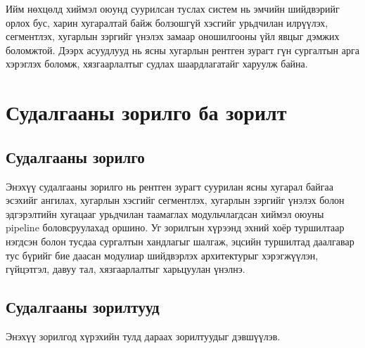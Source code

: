 Ийм нөхцөлд хиймэл оюунд суурилсан туслах систем нь эмчийн шийдвэрийг орлох бус, харин хугаралтай байж болзошгүй хэсгийг урьдчилан илрүүлэх, сегментлэх, хугарлын зэргийг үнэлэх замаар оношилгооны үйл явцыг дэмжих боломжтой. Дээрх асуудлууд нь ясны хугарлын рентген зурагт гүн сургалтын арга хэрэглэх боломж, хязгаарлалтыг судлах шаардлагатайг харуулж байна.


\section{Судалгааны зорилго ба зорилт}

\subsection*{Судалгааны зорилго}

Энэхүү судалгааны зорилго нь рентген зурагт суурилан ясны хугарал байгаа эсэхийг ангилах, хугарлын хэсгийг сегментлэх, хугарлын зэргийг үнэлэх болон эдгэрэлтийн хугацааг урьдчилан таамаглах модульчлагдсан хиймэл оюуны pipeline боловсруулахад оршино. Уг зорилгын хүрээнд эхний хоёр туршилтаар нэгдсэн болон тусдаа сургалтын хандлагыг шалгаж, эцсийн туршилтад даалгавар тус бүрийг бие даасан модулиар шийдвэрлэх архитектурыг хэрэгжүүлэн, гүйцэтгэл, давуу тал, хязгаарлалтыг харьцуулан үнэлнэ.

\subsection*{Судалгааны зорилтууд}

Энэхүү зорилгод хүрэхийн тулд дараах зорилтуудыг дэвшүүлэв.

